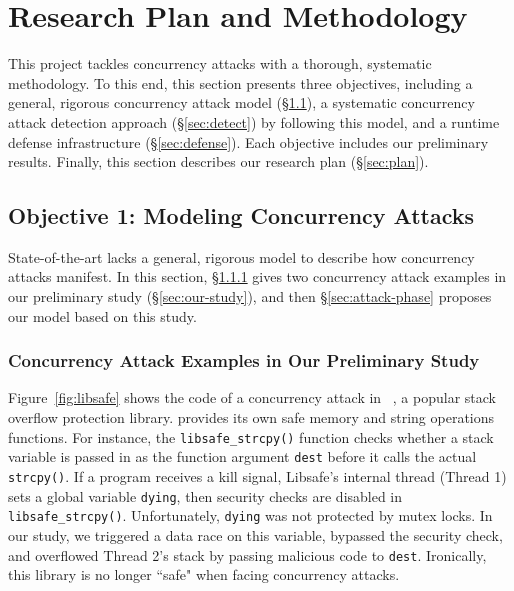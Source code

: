 \vspace{-.15in}\section{Research Plan and Methodology}
\label{sec:rep}\vspace{-.075in}

This \xxx project tackles concurrency attacks with a thorough, systematic 
methodology. To this end, this section presents three objectives, including a 
general, rigorous concurrency attack model (\S\ref{sec:model}), a systematic 
concurrency attack detection approach (\S\ref{sec:detect}) by following this 
model, and a runtime defense infrastructure (\S\ref{sec:defense}). Each 
objective includes our preliminary results. Finally, this section describes our 
research plan (\S\ref{sec:plan}).

\vspace{-.15in}\subsection{Objective 1: Modeling Concurrency Attacks} 
\label{sec:model}\vspace{-.075in}

State-of-the-art lacks a general, rigorous model to describe how concurrency 
attacks manifest. In this section, \S\ref{sec:examples} gives two concurrency 
attack examples in our preliminary study (\S\ref{sec:our-study}), and then 
\S\ref{sec:attack-phase} proposes our model based on this study.

\vspace{-.15in}\subsubsection{Concurrency Attack Examples in Our Preliminary 
Study} 
\label{sec:examples}\vspace{-.075in}

Figure~\ref{fig:libsafe} shows the code of a concurrency attack in 
\libsafe~\cite{libsafe}, a popular stack overflow protection library. \libsafe
provides its own safe memory and string operations functions. For instance, the 
\texttt{libsafe\_strcpy()} function checks whether a stack variable is passed 
in as the function argument \texttt{dest} before it calls the actual 
\texttt{strcpy()}. If a program receives a kill signal, Libsafe's internal 
thread (Thread 1) sets a global variable \texttt{dying}, then security checks 
are disabled in \texttt{libsafe\_strcpy()}. Unfortunately, \texttt{dying} was 
not protected by mutex locks. In our study, we triggered a data race on this 
variable, bypassed the security check, and overflowed Thread 2's stack by 
passing malicious code to \texttt{dest}. Ironically, this \libsafe library is 
no longer ``safe" when facing concurrency attacks.

